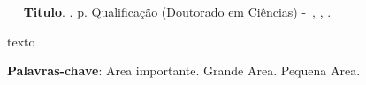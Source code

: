 \setlength{\absparsep}{18pt} %
\begin{resumo}
	\begin{flushleft} 
			\setlength{\absparsep}{0pt} %
			\SingleSpacing 
			\imprimirautorabr~ ~\textbf{Titulo}.	\imprimirdata. \pageref{LastPage}p. 
			Qualificação (Doutorado em Ciências) -~\imprimirinstituicao, \imprimirlocal, \imprimirdata.
 	\end{flushleft}
\OnehalfSpacing

	texto

 \textbf{Palavras-chave}: Area importante. Grande Area. Pequena Area.

\end{resumo}

